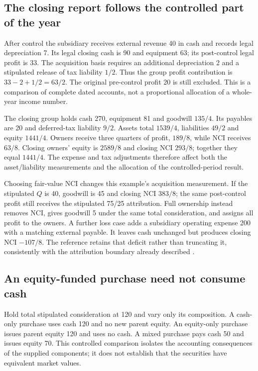 \subsection{The closing report follows the controlled part of the year}

After control the subsidiary receives external revenue 40 in cash and records legal depreciation 7. Its legal closing cash is 90 and equipment 63; its post-control legal profit is 33. The acquisition basis requires an additional depreciation 2 and a stipulated release of tax liability $1/2$. Thus the group profit contribution is $33-2+1/2=63/2$. The original pre-control profit 20 is still excluded. This is a comparison of complete dated accounts, not a proportional allocation of a whole-year income number.

The closing group holds cash 270, equipment 81 and goodwill $135/4$. Its payables are 20 and deferred-tax liability $9/2$. Assets total $1539/4$, liabilities $49/2$ and equity $1441/4$. Owners receive three quarters of profit, $189/8$, while NCI receives $63/8$. Closing owners' equity is $2589/8$ and closing NCI $293/8$; together they equal $1441/4$. The expense and tax adjustments therefore affect both the asset/liability measurements and the allocation of the controlled-period result.

Choosing fair-value NCI changes this example's acquisition measurement. If the stipulated $Q$ is 40, goodwill is 45 and closing NCI $383/8$; the same post-control profit still receives the stipulated 75/25 attribution. Full ownership instead removes NCI, gives goodwill 5 under the same total consideration, and assigns all profit to the owners. A further loss case adds a subsidiary operating expense 200 with a matching external payable. It leaves cash unchanged but produces closing NCI $-107/8$. The reference retains that deficit rather than truncating it, consistently with the attribution boundary already described \citep[B94]{aasb10control2026}.

\subsection{An equity-funded purchase need not consume cash}

Hold total stipulated consideration at 120 and vary only its composition. A cash-only purchase uses cash 120 and no new parent equity. An equity-only purchase issues parent equity 120 and uses no cash. A mixed purchase pays cash 50 and issues equity 70. This controlled comparison isolates the accounting consequences of the supplied components; it does not establish that the securities have equivalent market values.

